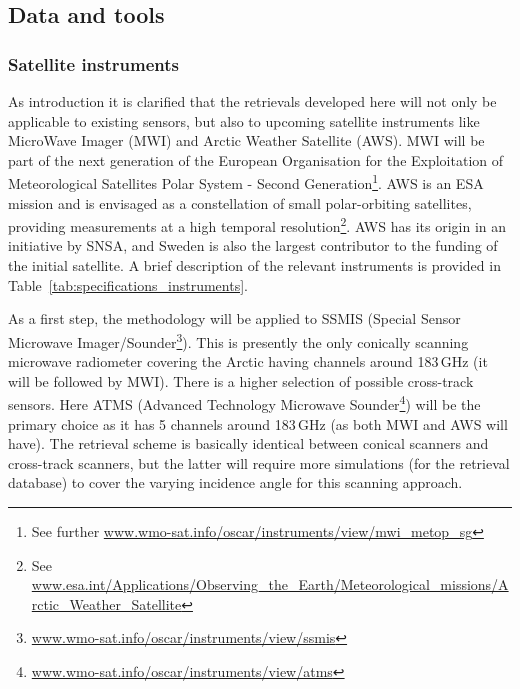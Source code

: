 \documentclass[12pt,oneside,a4paper]{article}
\begin{document}
\subsection{Data and tools}
% 
\subsubsection{Satellite instruments}

As introduction it is clarified that the retrievals developed here will not
only be applicable to existing sensors, but also to upcoming satellite
instruments like MicroWave Imager (MWI) and Arctic Weather Satellite (AWS). MWI
will be part of the next generation of the European Organisation for the
Exploitation of Meteorological Satellites Polar System - Second
Generation\footnote{See further
  \url{www.wmo-sat.info/oscar/instruments/view/mwi_metop_sg}}. AWS is an ESA
mission and is envisaged as a constellation of small polar-orbiting satellites,
providing measurements at a high temporal resolution\footnote{See
  \url{www.esa.int/Applications/Observing_the_Earth/Meteorological_missions/Arctic_Weather_Satellite}}.
AWS has its origin in an initiative by SNSA, and Sweden is also the largest
contributor to the funding of the initial satellite. A brief description of the
relevant instruments is provided in Table~\ref{tab:specifications_instruments}.

As a first step, the methodology will be applied to SSMIS (Special Sensor
Microwave
Imager/Sounder\footnote{\url{www.wmo-sat.info/oscar/instruments/view/ssmis}}).
This is presently the only conically scanning microwave radiometer covering the
Arctic having channels around 183\,GHz (it will be followed by MWI). There is a
higher selection of possible cross-track sensors. Here ATMS (Advanced
Technology Microwave
Sounder\footnote{\url{www.wmo-sat.info/oscar/instruments/view/atms}}) will be
the primary choice as it has 5 channels around 183\,GHz (as both MWI and AWS
will have). The retrieval scheme is basically identical between conical
scanners and cross-track scanners, but the latter will require more simulations
(for the retrieval database) to cover the varying incidence angle for this
scanning approach.
\end{document}
